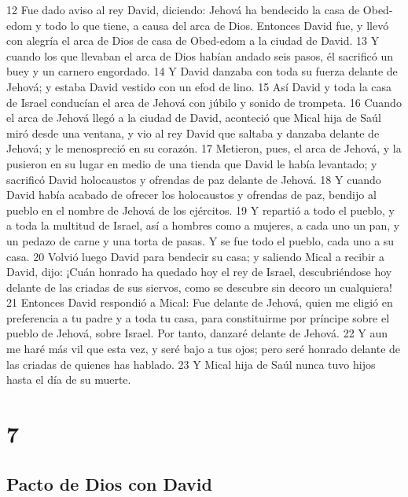  
12 Fue dado aviso al rey David, diciendo: Jehová ha bendecido la casa de Obed-edom y todo lo que tiene, a causa del arca de Dios. Entonces David fue, y llevó con alegría el arca de Dios de casa de Obed-edom a la ciudad de David.
13 Y cuando los que llevaban el arca de Dios habían andado seis pasos, él sacrificó un buey y un carnero engordado.
14 Y David danzaba con toda su fuerza delante de Jehová; y estaba David vestido con un efod de lino.
15 Así David y toda la casa de Israel conducían el arca de Jehová con júbilo y sonido de trompeta.
16 Cuando el arca de Jehová llegó a la ciudad de David, aconteció que Mical hija de Saúl miró desde una ventana, y vio al rey David que saltaba y danzaba delante de Jehová; y le menospreció en su corazón.
17 Metieron, pues, el arca de Jehová, y la pusieron en su lugar en medio de una tienda que David le había levantado; y sacrificó David holocaustos y ofrendas de paz delante de Jehová.
18 Y cuando David había acabado de ofrecer los holocaustos y ofrendas de paz, bendijo al pueblo en el nombre de Jehová de los ejércitos.
19 Y repartió a todo el pueblo, y a toda la multitud de Israel, así a hombres como a mujeres, a cada uno un pan, y un pedazo de carne y una torta de pasas. Y se fue todo el pueblo, cada uno a su casa.
20 Volvió luego David para bendecir su casa; y saliendo Mical a recibir a David, dijo: ¡Cuán honrado ha quedado hoy el rey de Israel, descubriéndose hoy delante de las criadas de sus siervos, como se descubre sin decoro un cualquiera!
21 Entonces David respondió a Mical: Fue delante de Jehová, quien me eligió en preferencia a tu padre y a toda tu casa, para constituirme por príncipe sobre el pueblo de Jehová, sobre Israel. Por tanto, danzaré delante de Jehová.
22 Y aun me haré más vil que esta vez, y seré bajo a tus ojos; pero seré honrado delante de las criadas de quienes has hablado. 
23 Y Mical hija de Saúl nunca tuvo hijos hasta el día de su muerte.

\chapter{7}

\section*{Pacto de Dios con David}

 


